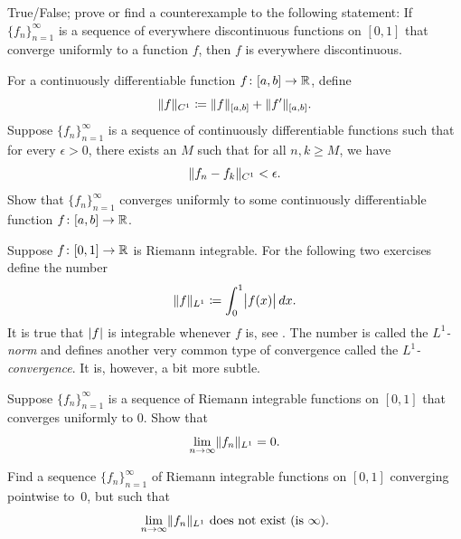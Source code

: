 \begin{exercise}
True/False; prove or find a counterexample to the following statement:
If $\{ f_n \}_{n=1}^\infty$ is a sequence of everywhere discontinuous functions on $[0,1]$
that converge uniformly to a function $f$, then $f$ is everywhere
discontinuous.
\end{exercise}

\begin{exercise} \label{c1uniflim:exercise}
For a continuously differentiable function $f \colon [a,b] \to {\mathbb{R}}$, define
\begin{equation*}
\lVert {f} \rVert_{C^1} \coloneqq \lVert {f} \rVert_{[a,b]} + \lVert {f'} \rVert_{[a,b]} .
\end{equation*}
Suppose $\{ f_n \}_{n=1}^\infty$ is a sequence of continuously differentiable
functions such that for every $\epsilon >0$, there exists an $M$
such that for all $n,k \geq M$, we have
\begin{equation*}
\lVert {f_n-f_k} \rVert_{C^1} < \epsilon .
\end{equation*}
Show that $\{ f_n \}_{n=1}^\infty$ converges uniformly to some continuously differentiable
function $f \colon [a,b] \to {\mathbb{R}}$.
\end{exercise}

\begin{exnote}
Suppose 
$f \colon [0,1] \to {\mathbb{R}}$ is Riemann integrable.
For the following two exercises define 
the number
\begin{equation*}
\lVert {f} \rVert_{L^1} \coloneqq 
\int_0^1 \bigl\lvert {f(x)} \bigr\rvert\,dx .
\end{equation*}
It is true that $\lvert {f} \rvert$ is integrable whenever $f$ is, see
.
The number is called the \emph{$L^1$-norm} and
defines another very common type of
convergence called the
\emph{$L^1$-convergence}.
It is, however, a bit more subtle.
\end{exnote}

\begin{exercise}
Suppose $\{ f_n \}_{n=1}^\infty$ is a sequence of Riemann integrable functions on $[0,1]$
that converges uniformly
to $0$.  Show that
\begin{equation*}
\lim_{n\to\infty} \lVert {f_n} \rVert_{L^1} = 0 .
\end{equation*}
\end{exercise}

\begin{exercise}
Find a sequence $\{ f_n \}_{n=1}^\infty$ of Riemann integrable functions 
on $[0,1]$ converging pointwise to~$0$, but such that
\begin{equation*}
\lim_{n\to\infty} \lVert {f_n} \rVert_{L^1} \text{ does not exist (is } \infty\text{)}.
\end{equation*}
\end{exercise}

